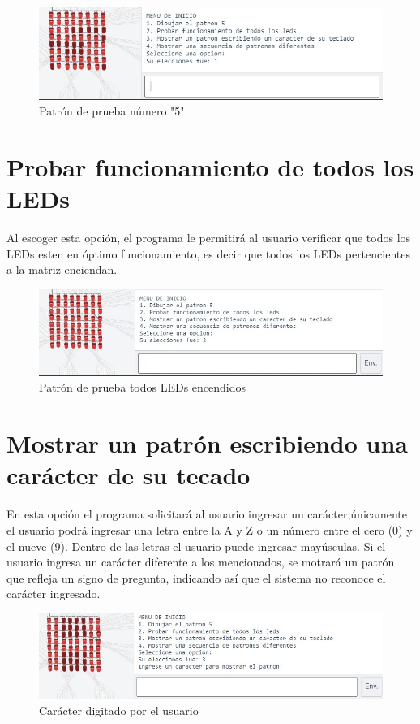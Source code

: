 \documentclass{article}
\begin{document}
    \begin{figure}[h]
    \includegraphics[width=13cm]{5.jpeg}
    \centering
    \caption{Patrón de prueba número "5"}
    \label{5}
    \end{figure}
    
\section{Probar funcionamiento de todos los LEDs}\label{op2}
Al escoger esta opción, el programa le permitirá al usuario verificar que todos los LEDs esten en óptimo funcionamiento, es decir que todos los LEDs pertencientes a la matriz enciendan.

    \begin{figure}[h]
    \includegraphics[width=13cm]{full.jpeg}
    \centering
    \caption{Patrón de prueba todos LEDs encendidos}
    \label{full}
    \end{figure}

\section{Mostrar un patrón escribiendo una carácter de su tecado}\label{op3}
En esta opción el programa solicitará al usuario ingresar un carácter,únicamente el usuario podrá ingresar una letra entre la A y Z o un número entre el cero (0) y el nueve (9). Dentro de las letras el usuario puede ingresar mayúsculas. Si el usuario ingresa un carácter diferente a los mencionados, se motrará un patrón que refleja un signo de pregunta, indicando así que el sistema no reconoce el carácter ingresado.

    \begin{figure}[h]
    \includegraphics[width=13cm]{patron.jpeg}
    \centering
    \caption{Carácter digitado por el usuario}
    \label{patron}
    \end{figure}
    
\end{document}

